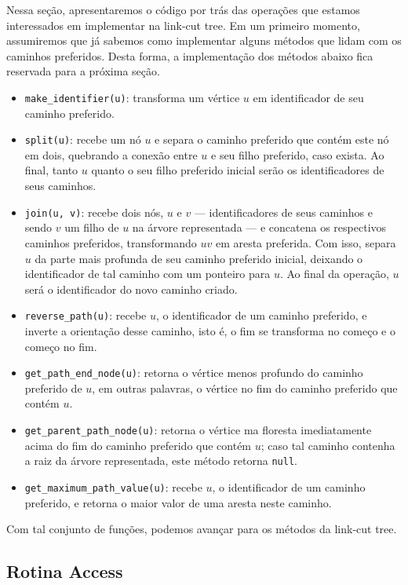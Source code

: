 Nessa seção, apresentaremos o código por trás das operações que estamos interessados em implementar na link-cut tree. Em um primeiro momento, assumiremos que já sabemos como implementar alguns métodos que lidam com os caminhos preferidos. Desta forma, a implementação dos métodos abaixo fica reservada para a próxima seção.

\begin{itemize}
    \item \texttt{make\_identifier(u)}: transforma um vértice $u$ em identificador de seu caminho preferido.
    \item \texttt{split(u)}: recebe um nó $u$ e separa o caminho preferido que contém este nó em dois, quebrando a conexão entre $u$ e seu filho preferido, caso exista. Ao final, tanto $u$ quanto o seu filho preferido inicial serão os identificadores de seus caminhos.
    \item \texttt{join(u, v)}: recebe dois nós, $u$ e $v$ --- identificadores de seus caminhos e sendo $v$ um filho de $u$ na árvore representada --- e concatena os respectivos caminhos preferidos, transformando $uv$ em aresta preferida. Com isso, separa $u$ da parte mais profunda de seu caminho preferido inicial, deixando o identificador de tal caminho com um ponteiro para $u$. Ao final da operação, $u$ será o identificador do novo caminho criado.
    \item \texttt{reverse\_path(u)}: recebe $u$, o identificador de um caminho preferido, e inverte a orientação desse caminho, isto é, o fim se transforma no começo e o começo no fim.
    \item \texttt{get\_path\_end\_node(u)}: retorna o vértice menos profundo do caminho preferido de $u$, em outras palavras, o vértice no fim do caminho preferido que contém $u$.
    \item \texttt{get\_parent\_path\_node(u)}: retorna o vértice ma floresta imediatamente acima do fim do caminho preferido que contém $u$; caso tal caminho contenha a raiz da árvore representada, este método retorna \texttt{null}.
    \item \texttt{get\_maximum\_path\_value(u)}:  recebe $u$, o identificador de um caminho preferido, e retorna o maior valor de uma aresta neste caminho.
\end{itemize}

Com tal conjunto de funções, podemos avançar para os métodos da link-cut tree.

\subsection{Rotina Access}
\label{subsection:lct-access}

